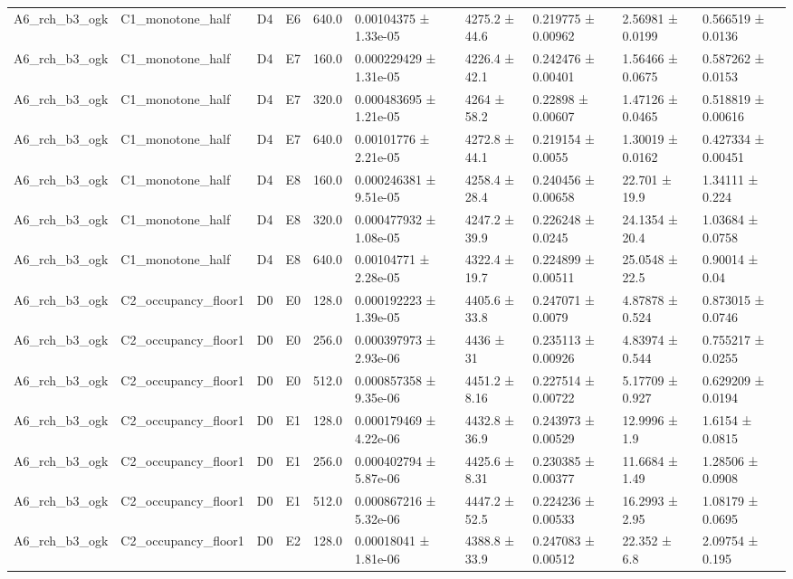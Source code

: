 \begin{table}
\begin{tabular}{llllllllll}
A6\_rch\_b3\_ogk & C1\_monotone\_half & D4 & E6 & 640.0 & 0.00104375 ± 1.33e-05 & 4275.2 ± 44.6 & 0.219775 ± 0.00962 & 2.56981 ± 0.0199 & 0.566519 ± 0.0136 \\
A6\_rch\_b3\_ogk & C1\_monotone\_half & D4 & E7 & 160.0 & 0.000229429 ± 1.31e-05 & 4226.4 ± 42.1 & 0.242476 ± 0.00401 & 1.56466 ± 0.0675 & 0.587262 ± 0.0153 \\
A6\_rch\_b3\_ogk & C1\_monotone\_half & D4 & E7 & 320.0 & 0.000483695 ± 1.21e-05 & 4264 ± 58.2 & 0.22898 ± 0.00607 & 1.47126 ± 0.0465 & 0.518819 ± 0.00616 \\
A6\_rch\_b3\_ogk & C1\_monotone\_half & D4 & E7 & 640.0 & 0.00101776 ± 2.21e-05 & 4272.8 ± 44.1 & 0.219154 ± 0.0055 & 1.30019 ± 0.0162 & 0.427334 ± 0.00451 \\
A6\_rch\_b3\_ogk & C1\_monotone\_half & D4 & E8 & 160.0 & 0.000246381 ± 9.51e-05 & 4258.4 ± 28.4 & 0.240456 ± 0.00658 & 22.701 ± 19.9 & 1.34111 ± 0.224 \\
A6\_rch\_b3\_ogk & C1\_monotone\_half & D4 & E8 & 320.0 & 0.000477932 ± 1.08e-05 & 4247.2 ± 39.9 & 0.226248 ± 0.0245 & 24.1354 ± 20.4 & 1.03684 ± 0.0758 \\
A6\_rch\_b3\_ogk & C1\_monotone\_half & D4 & E8 & 640.0 & 0.00104771 ± 2.28e-05 & 4322.4 ± 19.7 & 0.224899 ± 0.00511 & 25.0548 ± 22.5 & 0.90014 ± 0.04 \\
A6\_rch\_b3\_ogk & C2\_occupancy\_floor1 & D0 & E0 & 128.0 & 0.000192223 ± 1.39e-05 & 4405.6 ± 33.8 & 0.247071 ± 0.0079 & 4.87878 ± 0.524 & 0.873015 ± 0.0746 \\
A6\_rch\_b3\_ogk & C2\_occupancy\_floor1 & D0 & E0 & 256.0 & 0.000397973 ± 2.93e-06 & 4436 ± 31 & 0.235113 ± 0.00926 & 4.83974 ± 0.544 & 0.755217 ± 0.0255 \\
A6\_rch\_b3\_ogk & C2\_occupancy\_floor1 & D0 & E0 & 512.0 & 0.000857358 ± 9.35e-06 & 4451.2 ± 8.16 & 0.227514 ± 0.00722 & 5.17709 ± 0.927 & 0.629209 ± 0.0194 \\
A6\_rch\_b3\_ogk & C2\_occupancy\_floor1 & D0 & E1 & 128.0 & 0.000179469 ± 4.22e-06 & 4432.8 ± 36.9 & 0.243973 ± 0.00529 & 12.9996 ± 1.9 & 1.6154 ± 0.0815 \\
A6\_rch\_b3\_ogk & C2\_occupancy\_floor1 & D0 & E1 & 256.0 & 0.000402794 ± 5.87e-06 & 4425.6 ± 8.31 & 0.230385 ± 0.00377 & 11.6684 ± 1.49 & 1.28506 ± 0.0908 \\
A6\_rch\_b3\_ogk & C2\_occupancy\_floor1 & D0 & E1 & 512.0 & 0.000867216 ± 5.32e-06 & 4447.2 ± 52.5 & 0.224236 ± 0.00533 & 16.2993 ± 2.95 & 1.08179 ± 0.0695 \\
A6\_rch\_b3\_ogk & C2\_occupancy\_floor1 & D0 & E2 & 128.0 & 0.00018041 ± 1.81e-06 & 4388.8 ± 33.9 & 0.247083 ± 0.00512 & 22.352 ± 6.8 & 2.09754 ± 0.195 \\

\end{tabular}
\end{table}
